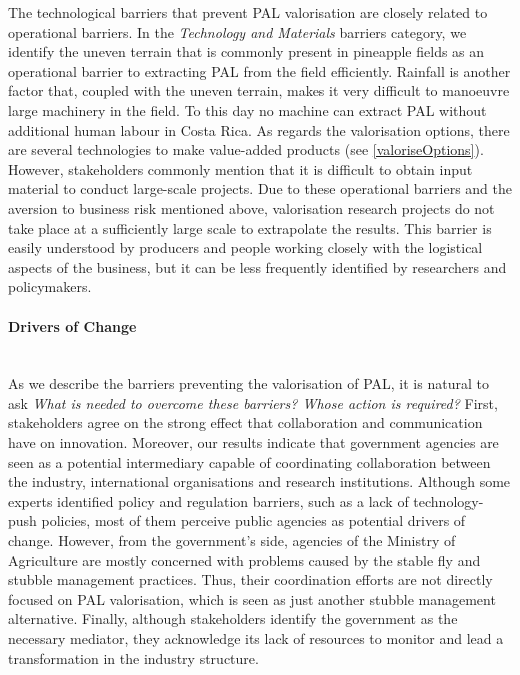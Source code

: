 The technological barriers that prevent PAL valorisation are closely related to operational barriers. In the \textit{Technology and Materials} barriers category, we identify the uneven terrain that is commonly present in pineapple fields as an operational barrier to extracting PAL from the field efficiently. Rainfall is another factor that, coupled with the uneven terrain, makes it very difficult to manoeuvre large machinery in the field. To this day no machine can extract PAL without additional human labour in Costa Rica. As regards the valorisation options, there are several technologies to make value-added products (see \cref{valoriseOptions}). However, stakeholders commonly mention that it is difficult to obtain input material to conduct large-scale projects. Due to these operational barriers and the aversion to business risk mentioned above, valorisation research projects do not take place at a sufficiently large scale to extrapolate the results. This barrier is easily understood by producers and people working closely with the logistical aspects of the business, but it can be less frequently identified by researchers and policymakers. 

\paragraph{Drivers of Change} \mbox{}\\
As we describe the barriers preventing the valorisation of PAL, it is natural to ask \textit{What is needed to overcome these barriers? Whose action is required?} First, stakeholders agree on the strong effect that collaboration and communication have on innovation. Moreover, our results indicate that government agencies are seen as a potential intermediary capable of coordinating collaboration between the industry, international organisations and research institutions. Although some experts identified policy and regulation barriers, such as a lack of technology-push policies, most of them perceive public agencies as potential drivers of change. However, from the government's side, agencies of the Ministry of Agriculture are mostly concerned with problems caused by the stable fly and stubble management practices. Thus, their coordination efforts are not directly focused on PAL valorisation, which is seen as just another stubble management alternative. Finally, although stakeholders identify the government as the necessary mediator, they acknowledge its lack of resources to monitor and lead a transformation in the industry structure. 


